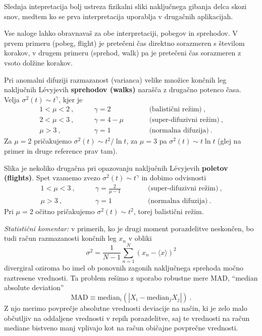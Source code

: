 \documentclass{article}
\begin{document}
Slednja intepretacija bolj ustreza fizikalni sliki naključnega gibanja delca skozi snov, medtem ko
se prva interpretacija uporablja v druga\v cnih aplikacijah.

Vse naloge lahko obravnavaš za obe interpretaciji, pobegov in sprehodov. V prvem primeru (pobeg, flight) je
prete\v ceni \v cas direktno sorazmeren s \v stevilom korakov, v drugem primeru (sprehod, walk) pa je
prete\v ceni \v cas  sorazmeren z vsoto dol\v zine korakov.


Pri anomalni difuziji razmazanost (varianca) velike množice
končnih leg naključnih L\'evyjevih \textbf{sprehodov (walks)} narašča z drugačno potenco časa.
Velja $\sigma^2(t) \sim t^\gamma$, kjer je
\begin{align*}
1 < \mu < 2 \>, &\qquad \gamma = 2 \> &\qquad&  \text{(balistični režim)}\>, \\
2 < \mu < 3 \>, &\qquad \gamma = 4 - \mu &\qquad&  \text{(super-difuzivni režim)}\>, \\
    \mu > 3 \>, &\qquad \gamma = 1 &\qquad&  \text{(normalna difuzija)} \>.
\end{align*}
Za $\mu=2$ pričakujemo $\sigma^2(t) \sim t^2 / \ln t$,
za $\mu=3$ pa $\sigma^2(t) \sim t \ln t$ (glej na primer \cite{weeks}
in druge reference prav tam).

Slika je nekoliko drugačna pri opazovanju naključnih L\'evyjevih \textbf{poletov (flights)}.
Spet vzamemo zvezo $\sigma^2(t) \sim t^\gamma$ in dobimo odvisnosti
\begin{align*}
1 < \mu < 3 \>, &\qquad \gamma = \frac{2}{\mu-1} \> &\qquad&  \text{(super-difuzivni režim)}\>, \\
    \mu > 3 \>, &\qquad \gamma = 1 &\qquad&  \text{(normalna difuzija)} \>.
\end{align*}
Pri $\mu=2$ očitno pričakujemo $\sigma^2(t) \sim t^2 $, torej balistični režim.
\newline


{\sl Statistični komentar:} v primerih, ko je drugi
moment porazdelitve neskončen, bo tudi račun razmazanosti
končnih leg $x_n$ v obliki
\begin{equation}
\sigma^2 = \frac{1}{N-1} \sum_{n=1}^N \left( x_n - \langle x \rangle \right)^2
\label{sig2}
\end{equation}
divergiral oziroma bo imel ob ponovnih zagonih naključnega sprehoda
močno raztresene vrednosti. Ta problem rešimo z uporabo robustne mere MAD,
``median absolute deviation''
\begin{equation*}
  \mathrm{MAD} \equiv \mathrm{median}_i\left( | X_i - \mathrm{median}_j X_j | \right) \>.
\end{equation*}
Z njo merimo povprečje absolutne vrednosti deviacije na način,
ki je zelo malo občutljiv na oddaljene vrednosti v repih porazdelitve,
saj te vrednosti na račun mediane bistveno manj vplivajo kot na
račun običajne povprečne vrednosti.
\end{document}
